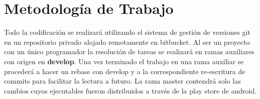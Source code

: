 \section{Metodología de Trabajo}
Todo la codificación se realizará utilizando el sistema de gestión de versiones git en un repositorio privado alojado remotamente en bitbucket. Al ser un proyecto con un único programador la resolución de tareas se realizará en ramas auxiliares con origen en \textbf{develop}. Una vez terminado el trabajo en una rama auxiliar se procederá a hacer un rebase con develop y a la correspondiente re-escritura de commits para facilitar la lectura a futuro. La rama master contendrá solo las cambios cuyos ejecutables fueron distribuidos a través de la play store de android.

